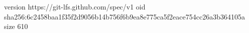 version https://git-lfs.github.com/spec/v1
oid sha256:6c2458baa1f35f2d9056b14b756f6b9ea8e775ca5f2eace754cc26a3b364105a
size 610
